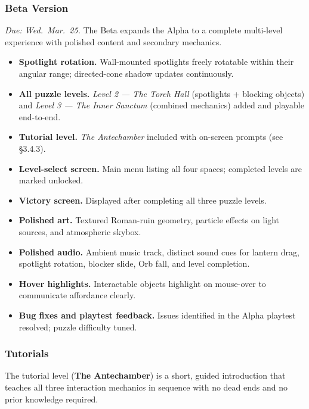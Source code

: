 \documentclass[11pt, letterpaper]{article}
\begin{document}
        \subsubsection{Beta Version}
        \textit{Due: Wed.\ Mar.\ 25.} The Beta expands the Alpha to a
        complete multi-level experience with polished content and secondary
        mechanics.

        \begin{itemize}[leftmargin=1.5em, itemsep=2pt]
            \item \textbf{Spotlight rotation.} Wall-mounted spotlights
                  freely rotatable within their angular range; directed-cone
                  shadow updates continuously.
            \item \textbf{All puzzle levels.} \textit{Level 2 --- The Torch
                  Hall} (spotlights + blocking objects) and \textit{Level 3
                  --- The Inner Sanctum} (combined mechanics) added and
                  playable end-to-end.
            \item \textbf{Tutorial level.} \textit{The Antechamber} included
                  with on-screen prompts (see \S3.4.3).
            \item \textbf{Level-select screen.} Main menu listing all four
                  spaces; completed levels are marked unlocked.
            \item \textbf{Victory screen.} Displayed after completing all
                  three puzzle levels.
            \item \textbf{Polished art.} Textured Roman-ruin geometry,
                  particle effects on light sources, and atmospheric skybox.
            \item \textbf{Polished audio.} Ambient music track, distinct
                  sound cues for lantern drag, spotlight rotation, blocker
                  slide, Orb fall, and level completion.
            \item \textbf{Hover highlights.} Interactable objects highlight
                  on mouse-over to communicate affordance clearly.
            \item \textbf{Bug fixes and playtest feedback.} Issues identified
                  in the Alpha playtest resolved; puzzle difficulty tuned.
        \end{itemize}

        \subsubsection{Tutorials}
        The tutorial level (\textbf{The Antechamber}) is a short, guided
        introduction that teaches all three interaction mechanics in sequence
        with no dead ends and no prior knowledge required.
\end{document}
